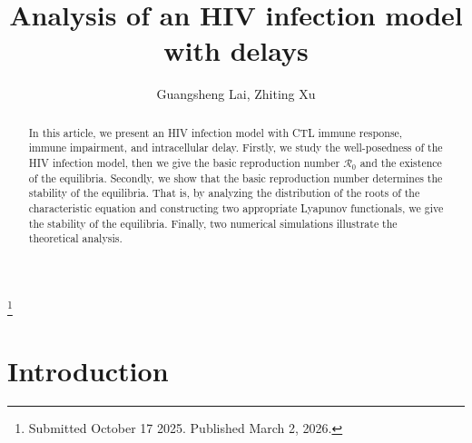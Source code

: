 \documentclass[reqno]{amsart}
\begin{document}
\title[\hfilneg EJDE-2026/20\hfil HIV infection model with delays]
{Analysis of an HIV infection model with delays}

\author[G.  Lai, Z. Xu \hfil EJDE-2026/20\hfilneg]
{Guangsheng  Lai, Zhiting Xu}

\address{Guangsheng Lai  \newline
School of  Mathematical Sciences,
South China Normal University,
Guangzhou, 510631,  China}

\address{Zhiting Xu \newline
School of  Mathematical Sciences,
South China Normal University,
Guangzhou, 510631,  China}

\thanks{Submitted October 17 2025. Published March 2, 2026.}

\begin{abstract}
In this article, we present an HIV infection model with CTL immune response,
immune impairment,  and  intracellular delay. Firstly, we study the well-posedness of the
HIV infection model, then we give the basic reproduction number $\mathcal{R}_0$
and the existence of the equilibria.
Secondly, we show that the basic reproduction number determines the  stability  of the
equilibria. That is, by analyzing the distribution of the roots of
the characteristic equation and constructing two appropriate Lyapunov functionals,
we give the stability of the equilibria.
Finally, two numerical simulations illustrate the theoretical analysis.
\end{abstract}

\maketitle
{}
\newtheorem{theorem}{Theorem}[section]
\allowdisplaybreaks

\section{Introduction}
\end{document}
